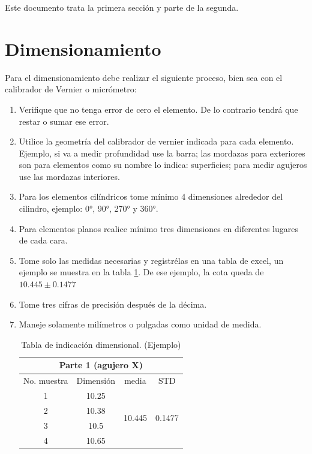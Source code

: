 \documentclass[letterpaper,pdftex]{article}
\begin{document}
Este documento trata la primera sección y parte de la segunda.

\section{Dimensionamiento}

Para el dimensionamiento debe realizar el siguiente proceso, bien sea con el calibrador de Vernier o micrómetro:

\begin{enumerate}
\item Verifique que no tenga error de cero el elemento. De lo contrario tendrá que restar o sumar ese error.
\item Utilice la geometría del calibrador de vernier indicada para cada elemento. Ejemplo, si va a medir profundidad use la barra; las mordazas para exteriores son para elementos como su nombre lo indica: superficies; para medir agujeros use las mordazas interiores. 
\item Para los elementos cilíndricos tome mínimo 4 dimensiones alrededor del cilindro, ejemplo: 0°, 90°, 270° y 360°.
\item Para elementos planos realice mínimo tres dimensiones en diferentes lugares de cada cara.
\item Tome solo las medidas necesarias y registrélas en una tabla de excel, un ejemplo se muestra en la tabla \ref{tab:muestra}. De ese ejemplo, la cota queda de $10.445 \pm 0.1477$
\item Tome tres cifras de precisión después de la décima.
\item Maneje solamente milímetros o pulgadas como unidad de medida.

\begin{table}
\begin{centering}
\begin{tabular}{|c|c|c|c|}
\hline 
\multicolumn{4}{|c|}{Parte 1 (agujero X)}\tabularnewline
\hline 
No. muestra & Dimensión & media & STD\tabularnewline
\hline 
\hline 
1 & 10.25 & \multirow{4}{*}{10.445} & \multirow{4}{*}{0.1477}\tabularnewline
\cline{1-2} \cline{2-2} 
2 & 10.38 &  & \tabularnewline
\cline{1-2} \cline{2-2} 
3 & 10.5 &  & \tabularnewline
\cline{1-2} \cline{2-2} 
4 & 10.65 &  & \tabularnewline
\hline 
\end{tabular}
\par\end{centering}
\caption{Tabla de indicación dimensional. (Ejemplo)}
\label{tab:muestra}
\end{table}
\end{enumerate}
\end{document}
